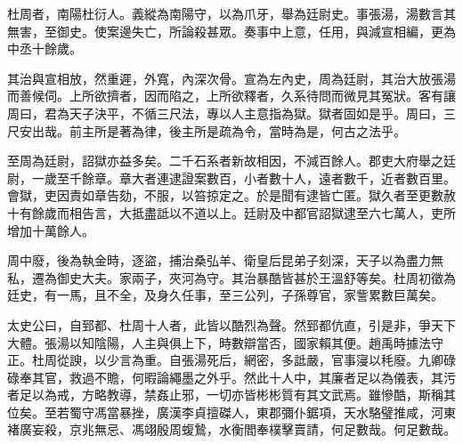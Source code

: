 杜周者，南陽杜衍人。義縱為南陽守，以為爪牙，舉為廷尉史。事張湯，湯數言其無害，至御史。使案邊失亡，所論殺甚眾。奏事中上意，任用，與減宣相編，更為中丞十餘歲。

其治與宣相放，然重遲，外寬，內深次骨。宣為左內史，周為廷尉，其治大放張湯而善候伺。上所欲擠者，因而陷之，上所欲釋者，久系待問而微見其冤狀。客有讓周曰，君為天子決平，不循三尺法，專以人主意指為獄。獄者固如是乎。周曰，三尺安出哉。前主所是著為律，後主所是疏為令，當時為是，何古之法乎。

至周為廷尉，詔獄亦益多矣。二千石系者新故相因，不減百餘人。郡吏大府舉之廷尉，一歲至千餘章。章大者連逮證案數百，小者數十人，遠者數千，近者數百里。會獄，吏因責如章告劾，不服，以笞掠定之。於是聞有逮皆亡匿。獄久者至更數赦十有餘歲而相告言，大抵盡詆以不道以上。廷尉及中都官詔獄逮至六七萬人，吏所增加十萬餘人。

周中廢，後為執金時，逐盜，捕治桑弘羊、衛皇后昆弟子刻深，天子以為盡力無私，遷為御史大夫。家兩子，夾河為守。其治暴酷皆甚於王溫舒等矣。杜周初徵為廷史，有一馬，且不全，及身久任事，至三公列，子孫尊官，家訾累數巨萬矣。

太史公曰，自郅都、杜周十人者，此皆以酷烈為聲。然郅都伉直，引是非，爭天下大體。張湯以知陰陽，人主與俱上下，時數辯當否，國家賴其便。趙禹時據法守正。杜周從諛，以少言為重。自張湯死后，網密，多詆嚴，官事寖以秏廢。九卿碌碌奉其官，救過不贍，何暇論繩墨之外乎。然此十人中，其廉者足以為儀表，其污者足以為戒，方略教導，禁姦止邪，一切亦皆彬彬質有其文武焉。雖慘酷，斯稱其位矣。至若蜀守馮當暴挫，廣漢李貞擅磔人，東郡彌仆鋸項，天水駱璧推咸，河東褚廣妄殺，京兆無忌、馮翊殷周蝮鷙，水衡閻奉樸擊賣請，何足數哉。何足數哉。